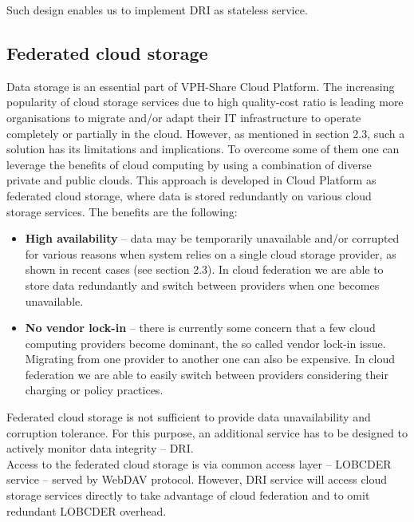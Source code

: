 Such design enables us to implement DRI as stateless service.

\subsection{Federated cloud storage}
\label{federated-cloud-storage}
Data storage is an essential part of VPH-Share Cloud Platform. The increasing
popularity of cloud storage services due to high quality-cost ratio is leading
more organisations to migrate and/or adapt their IT infrastructure to operate
completely or partially in the cloud. However, as mentioned in section 2.3, 
such a solution has its limitations and implications. To overcome some of 
them one can leverage the benefits of cloud computing by using a combination 
of diverse private and public clouds. This approach is developed in Cloud
Platform as federated cloud storage, where data is stored redundantly on 
various cloud storage services. The benefits are the following:

\begin{itemize}
	\item \textbf{High availability} -- data may be temporarily unavailable 
	and/or corrupted for various reasons when system relies on a single cloud 
	storage provider, as shown in recent cases (see section 2.3). In cloud
	federation we are able to store data redundantly and switch between 
	providers when one becomes unavailable.
	\item \textbf{No vendor lock-in} -- there is currently some concern that 
	a few cloud computing providers become dominant, the so called vendor 
	lock-in issue. Migrating from one provider to another one can also be
	expensive. In cloud federation we are able to easily switch between
	providers considering their charging or policy practices.
\end{itemize}

Federated cloud storage is not sufficient to provide data unavailability 
and corruption tolerance. For this purpose, an additional service
has to be designed to actively monitor data integrity -- DRI.\\

Access to the federated cloud storage is via common access layer -- LOBCDER
service -- served by WebDAV protocol. However, DRI service will access
cloud storage services directly to take advantage of cloud federation and
to omit redundant LOBCDER overhead.

